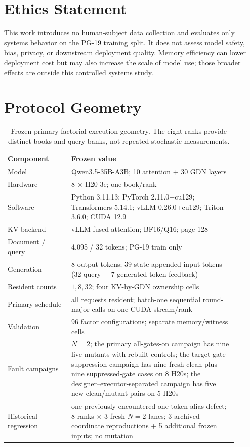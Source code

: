 \documentclass{article}
\begin{document}
\section{Ethics Statement}

This work introduces no human-subject data collection and evaluates only
systems behavior on the PG-19 training split.  It does not assess model safety,
bias, privacy, or downstream deployment quality.  Memory efficiency can lower
deployment cost but may also increase the scale of model use; those broader
effects are outside this controlled systems study.

\section{Protocol Geometry}
\label{app:protocol-geometry}

\begin{table}[H]
  \caption{Frozen primary-factorial execution geometry.  The eight ranks
  provide distinct books and query banks, not repeated stochastic
  measurements.}
  \label{tab:protocol}
  \centering
  \small
  \begin{tabular}{@{}p{0.25\linewidth}p{0.65\linewidth}@{}}
    \toprule
    Component & Frozen value \\
    \midrule
    Model & Qwen3.5-35B-A3B; 10 attention + 30 GDN layers \\
    Hardware & 8 $\times$ H20-3e; one book/rank \\
    Software & Python 3.11.13; PyTorch 2.11.0+cu129; Transformers 5.14.1; vLLM 0.26.0+cu129; Triton 3.6.0; CUDA 12.9 \\
    KV backend & vLLM fused attention; BF16/Q16; page 128 \\
    Document / query & 4,095 / 32 tokens; PG-19 train only \\
    Generation & 8 output tokens; 39 state-appended input tokens (32 query + 7 generated-token feedback) \\
    Resident counts & $1,8,32$; four KV-by-GDN ownership cells \\
    Primary schedule & all requests resident; batch-one sequential round-major calls on one CUDA stream/rank \\
    Validation & 96 factor configurations; separate memory/witness cells \\
    Fault campaigns & $N=2$; the primary all-gates-on campaign has nine live mutants with rebuilt controls; the target-gate-suppression campaign has nine fresh clean plus nine suppressed-gate cases on 8 H20s; the designer--executor-separated campaign has five new clean/mutant pairs on 5 H20s \\
    Historical regression & one previously encountered one-token alias defect; 8 ranks $\times$ 3 fresh $N=2$ lanes; 3 archived-coordinate reproductions + 5 additional frozen inputs; no mutation \\
    \bottomrule
  \end{tabular}
\end{table}
\end{document}
